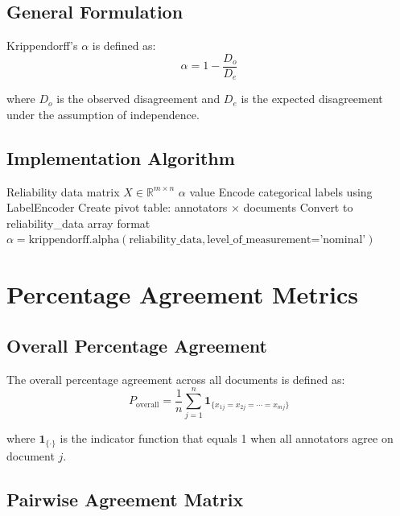 \documentclass[11pt]{article}
\begin{document}
\subsection{General Formulation}

Krippendorff's $\alpha$ is defined as:
\begin{equation}
\alpha = 1 - \frac{D_o}{D_e}
\end{equation}

where $D_o$ is the observed disagreement and $D_e$ is the expected disagreement under the assumption of independence.

\subsection{Implementation Algorithm}

\begin{algorithm}
\caption{Krippendorff's Alpha Calculation (as implemented)}
\begin{algorithmic}[1]
\REQUIRE Reliability data matrix $X \in \mathbb{R}^{m \times n}$
\ENSURE $\alpha$ value
\STATE Encode categorical labels using LabelEncoder
\STATE Create pivot table: annotators × documents
\STATE Convert to reliability\_data array format
\STATE \RETURN $\alpha = \text{krippendorff.alpha}(\text{reliability\_data}, \text{level\_of\_measurement='nominal'})$
\end{algorithmic}
\end{algorithm}

\section{Percentage Agreement Metrics}

\subsection{Overall Percentage Agreement}

The overall percentage agreement across all documents is defined as:
\begin{equation}
P_{\text{overall}} = \frac{1}{n} \sum_{j=1}^{n} \mathbf{1}_{\{x_{1j} = x_{2j} = \cdots = x_{mj}\}}
\end{equation}

where $\mathbf{1}_{\{\cdot\}}$ is the indicator function that equals 1 when all annotators agree on document $j$.

\subsection{Pairwise Agreement Matrix}
\end{document}
